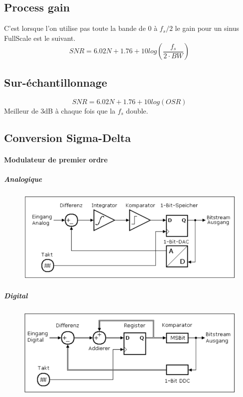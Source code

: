 \documentclass[resume]{subfiles}
\begin{document}
\subsection{Process gain}
C'est lorsque l'on utilise pas toute la bande de 0 à $f_s/2$
le gain pour un sinus FullScale est le suivant.
\begin{equation}
SNR = 6.02N + 1.76 + 10log(\frac{f_s}{2\cdot BW})
\end{equation}

\subsection{Sur-échantillonnage}
\begin{equation}
SNR = 6.02N + 1.76 + 10log(OSR)
\end{equation}
Meilleur de 3dB à chaque fois que la $f_s$ double.

\subsection{Conversion Sigma-Delta}
\paragraph{Modulateur de premier ordre}
\subparagraph{Analogique}
\begin{figure}[H]
    \centering
    \includegraphics[width=0.8\columnwidth]{../images/OpAmp1/1ordreSD.png}
\end{figure}

\subparagraph{Digital}
\begin{figure}[H]
    \centering
    \includegraphics[width=0.8\columnwidth]{../images/OpAmp1/1ordreSDnum.png}
\end{figure}
\end{document}
